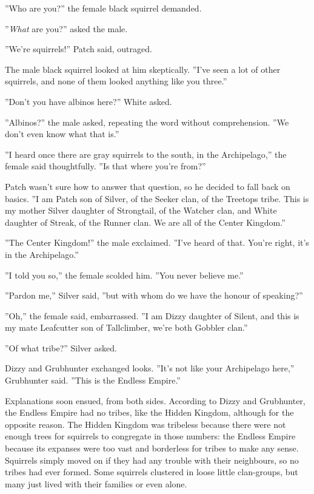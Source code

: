 \documentclass[12pt]{book}
\begin{document}
''Who are you?'' the female black squirrel demanded.

''{\it What} are you?'' asked the male.

''We're squirrels!'' Patch said, outraged.

The male black squirrel looked at him skeptically. ''I've seen a lot of other squirrels, and none of them looked anything like you three.''

''Don't you have albinos here?'' White asked.

''Albinos?'' the male asked, repeating the word without comprehension. ''We don't even know what that is.''

''I heard once there are gray squirrels to the south, in the Archipelago,'' the female said thoughtfully. ''Is that where you're from?''

Patch wasn't sure how to answer that question, so he decided to fall back on basics. ''I am Patch son of Silver, of the Seeker clan, of the Treetops tribe. This is my mother Silver daughter of Strongtail, of the Watcher clan, and White daughter of Streak, of the Runner clan. We are all of the Center Kingdom.''

''The Center Kingdom!'' the male exclaimed. ''I've heard of that. You're right, it's in the Archipelago.''

''I told you so,'' the female scolded him. ''You never believe me.''

''Pardon me,'' Silver said, ''but with whom do we have the honour of speaking?''

''Oh,'' the female said, embarrassed. ''I am Dizzy daughter of Silent, and this is my mate Leafcutter son of Tallclimber, we're both Gobbler clan.''

''Of what tribe?'' Silver asked.

Dizzy and Grubhunter exchanged looks. ''It's not like your Archipelago here,'' Grubhunter said. ''This is the Endless Empire.''

Explanations soon ensued, from both sides. According to Dizzy and Grubhunter, the Endless Empire had no tribes, like the Hidden Kingdom, although for the opposite reason. The Hidden Kingdom was tribeless because there were not enough trees for squirrels to congregate in those numbers: the Endless Empire because its expanses were too vast and borderless for tribes to make any sense. Squirrels simply moved on if they had any trouble with their neighbours, so no tribes had ever formed. Some squirrels clustered in loose little clan-groups, but many just lived with their families or even alone.
\end{document}
